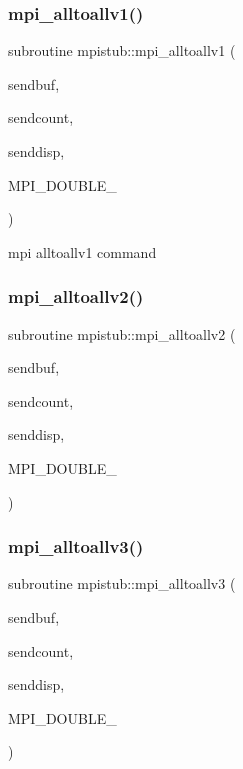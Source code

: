 \mbox{\label{namespacempistub_aa93ced1f07150fe7c8d11a35a0b77b1f}} 
\subsubsection{\texorpdfstring{mpi\_alltoallv1()}{mpi\_alltoallv1()}}
{\footnotesize\ttfamily subroutine mpistub\+::mpi\+\_\+alltoallv1 (\begin{DoxyParamCaption}\item[{double complex, dimension(\+:)}]{sendbuf,  }\item[{integer, dimension(\+:)}]{sendcount,  }\item[{integer, dimension(\+:)}]{senddisp,  }\item[{}]{M\+P\+I\+\_\+\+D\+O\+U\+B\+L\+E\+\_\+ }\end{DoxyParamCaption})}



mpi alltoallv1 command 

\mbox{\label{namespacempistub_ac85c372d1990a0cfd2b6cb31a0be0b47}} 
\subsubsection{\texorpdfstring{mpi\_alltoallv2()}{mpi\_alltoallv2()}}
{\footnotesize\ttfamily subroutine mpistub\+::mpi\+\_\+alltoallv2 (\begin{DoxyParamCaption}\item[{double precision, dimension(\+:)}]{sendbuf,  }\item[{integer, dimension(\+:)}]{sendcount,  }\item[{integer, dimension(\+:)}]{senddisp,  }\item[{}]{M\+P\+I\+\_\+\+D\+O\+U\+B\+L\+E\+\_\+ }\end{DoxyParamCaption})}

\mbox{\label{namespacempistub_a9e2b2b4a1d6bda704e33a2acfcfb9cfd}} 
\subsubsection{\texorpdfstring{mpi\_alltoallv3()}{mpi\_alltoallv3()}}
{\footnotesize\ttfamily subroutine mpistub\+::mpi\+\_\+alltoallv3 (\begin{DoxyParamCaption}\item[{integer, dimension(\+:)}]{sendbuf,  }\item[{integer, dimension(\+:)}]{sendcount,  }\item[{integer, dimension(\+:)}]{senddisp,  }\item[{}]{M\+P\+I\+\_\+\+D\+O\+U\+B\+L\+E\+\_\+ }\end{DoxyParamCaption})}

